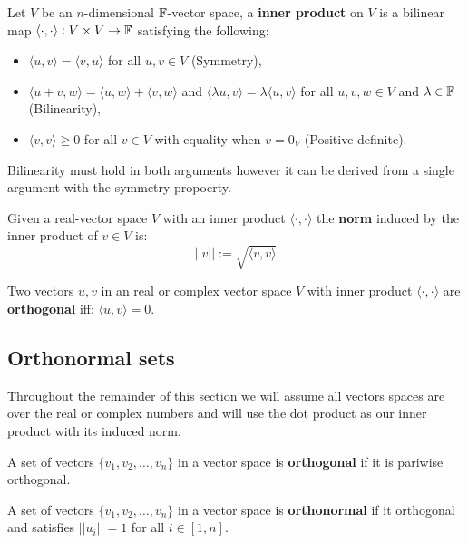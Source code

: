 \begin{definition}
    Let $V$ be an $n$-dimensional $\mathbb{F}$-vector space, a \textbf{inner product} on $V$ is a bilinear map $\langle\cdot,\cdot\rangle: V \times V \rightarrow \mathbb{F}$ satisfying the following: \begin{itemize}
        \item $\langle u,v \rangle=\langle v,u \rangle$ for all $u,v\in V$ (Symmetry),
        \item $\langle u+v,w \rangle=\langle u,w \rangle+\langle v,w \rangle$ and $\langle \lambda u,v \rangle=\lambda\langle u,v \rangle$ for all $u,v,w\in V$ and $\lambda\in\mathbb{F}$ (Bilinearity),
        \item $\langle v,v \rangle\geq 0$ for all $v\in V$ with equality when $v=0_V$ (Positive-definite).
    \end{itemize}
    Bilinearity must hold in both arguments however it can be derived from a single argument with the symmetry propoerty.
\end{definition}

\begin{definition}[Norm]
    Given a real-vector space $V$ with an inner product $\langle\cdot,\cdot\rangle$ the \textbf{norm} induced by the inner product of $v\in V$ is: \[
        ||v|| := \sqrt{\langle v,v\rangle}
    \]
\end{definition}

\begin{definition}[Orthogonality]
    Two vectors $u,v$ in an real or complex vector space $V$  with inner product $\langle\cdot,\cdot\rangle$ are \textbf{orthogonal} iff: $\langle u, v\rangle=0$.
\end{definition}

\subsection{Orthonormal sets}
Throughout the remainder of this section we will assume all vectors spaces are over the real or complex numbers and will use the dot product as our inner product with its induced norm.

\begin{definition}
    A set of vectors $\{v_1,v_2,\ldots,v_n\}$ in a vector space is \textbf{orthogonal} if it is pariwise orthogonal.
\end{definition}

\begin{definition}
    A set of vectors $\{v_1,v_2,\ldots,v_n\}$ in a vector space is \textbf{orthonormal} if it orthogonal and satisfies $||u_i||=1$ for all $i\in[1,n]$.
\end{definition}

